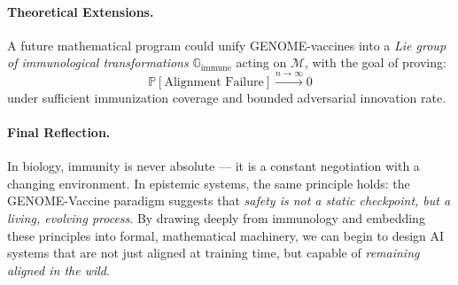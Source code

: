 \paragraph{Theoretical Extensions.}  
A future mathematical program could unify GENOME-vaccines into a \emph{Lie group of immunological transformations} $\mathbb{G}_\mathrm{immune}$ acting on $\mathcal{M}$, with the goal of proving:
\[
\mathbb{P}[\text{Alignment Failure}] \xrightarrow{n \to \infty} 0
\]
under sufficient immunization coverage and bounded adversarial innovation rate.

\paragraph{Final Reflection.}  
In biology, immunity is never absolute — it is a constant negotiation with a changing environment. In epistemic systems, the same principle holds: the GENOME-Vaccine paradigm suggests that \emph{safety is not a static checkpoint, but a living, evolving process}. By drawing deeply from immunology and embedding these principles into formal, mathematical machinery, we can begin to design AI systems that are not just aligned at training time, but capable of \emph{remaining aligned in the wild}.






